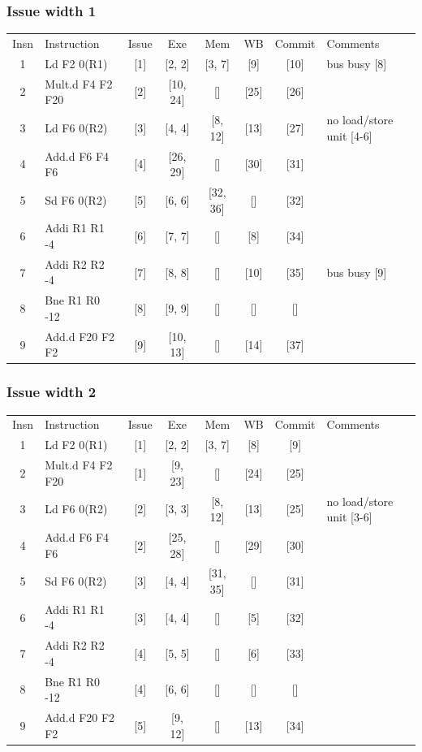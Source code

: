 \documentclass[11pt]{article}
\begin{document}
\subsubsection*{Issue width 1}
\begin{center}
\scriptsize
\setlength{\tabcolsep}{8pt}
\renewcommand{\arraystretch}{1.35}
\begin{tabular}{clccccc>{\raggedright\arraybackslash}p{1.4in}}
Insn & Instruction & Issue & Exe & Mem & WB & Commit & Comments \\
1 & Ld F2 0(R1) & [1] & [2, 2] & [3, 7] & [9] & [10] & bus busy [8] \\
2 & Mult.d F4 F2 F20 & [2] & [10, 24] & [] & [25] & [26] &  \\
3 & Ld F6 0(R2) & [3] & [4, 4] & [8, 12] & [13] & [27] & no load/store unit [4-6] \\
4 & Add.d F6 F4 F6 & [4] & [26, 29] & [] & [30] & [31] &  \\
5 & Sd F6 0(R2) & [5] & [6, 6] & [32, 36] & [] & [32] &  \\
6 & Addi R1 R1 -4 & [6] & [7, 7] & [] & [8] & [34] &  \\
7 & Addi R2 R2 -4 & [7] & [8, 8] & [] & [10] & [35] & bus busy [9] \\
8 & Bne R1 R0 -12 & [8] & [9, 9] & [] & [] & [] &  \\
9 & Add.d F20 F2 F2 & [9] & [10, 13] & [] & [14] & [37] &  \\
\end{tabular}
\end{center}
\subsubsection*{Issue width 2}
\begin{center}
\scriptsize
\setlength{\tabcolsep}{8pt}
\renewcommand{\arraystretch}{1.35}
\begin{tabular}{clccccc>{\raggedright\arraybackslash}p{1.4in}}
Insn & Instruction & Issue & Exe & Mem & WB & Commit & Comments \\
1 & Ld F2 0(R1) & [1] & [2, 2] & [3, 7] & [8] & [9] &  \\
2 & Mult.d F4 F2 F20 & [1] & [9, 23] & [] & [24] & [25] &  \\
3 & Ld F6 0(R2) & [2] & [3, 3] & [8, 12] & [13] & [25] & no load/store unit [3-6] \\
4 & Add.d F6 F4 F6 & [2] & [25, 28] & [] & [29] & [30] &  \\
5 & Sd F6 0(R2) & [3] & [4, 4] & [31, 35] & [] & [31] &  \\
6 & Addi R1 R1 -4 & [3] & [4, 4] & [] & [5] & [32] &  \\
7 & Addi R2 R2 -4 & [4] & [5, 5] & [] & [6] & [33] &  \\
8 & Bne R1 R0 -12 & [4] & [6, 6] & [] & [] & [] &  \\
9 & Add.d F20 F2 F2 & [5] & [9, 12] & [] & [13] & [34] &  \\
\end{tabular}
\end{center}
\end{document}
